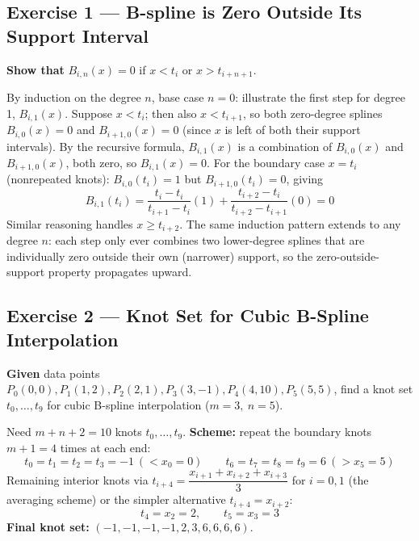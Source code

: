 \documentclass[12pt, a4paper]{article}
\newenvironment{solutionbox}{\begin{mdframed}[style=solutionframe]}{\end{mdframed}}
\newenvironment{answerbox}{\begin{mdframed}[style=answerframe]}{\end{mdframed}}
\begin{document}
\subsection*{Exercise 1 --- B-spline is Zero Outside Its Support Interval}
\begin{solutionbox}
\textbf{Show that} $B_{i,n}(x)=0$ if $x<t_i$ or $x>t_{i+n+1}$.
\end{solutionbox}
\begin{answerbox}
By induction on the degree $n$, base case $n=0$: illustrate the first step for degree 1, $B_{i,1}(x)$. Suppose $x<t_i$; then also $x<t_{i+1}$, so both zero-degree splines $B_{i,0}(x)=0$ and $B_{i+1,0}(x)=0$ (since $x$ is left of both their support intervals). By the recursive formula, $B_{i,1}(x)$ is a combination of $B_{i,0}(x)$ and $B_{i+1,0}(x)$, both zero, so $B_{i,1}(x)=0$.
For the boundary case $x=t_i$ (nonrepeated knots): $B_{i,0}(t_i)=1$ but $B_{i+1,0}(t_i)=0$, giving
$$B_{i,1}(t_i) = \frac{t_i-t_i}{t_{i+1}-t_i}(1) + \frac{t_{i+2}-t_i}{t_{i+2}-t_{i+1}}(0) = 0$$
Similar reasoning handles $x\ge t_{i+2}$. The same induction pattern extends to any degree $n$: each step only ever combines two lower-degree splines that are individually zero outside their own (narrower) support, so the zero-outside-support property propagates upward.
\end{answerbox}

\subsection*{Exercise 2 --- Knot Set for Cubic B-Spline Interpolation}
\begin{solutionbox}
\textbf{Given} data points $P_0(0,0),P_1(1,2),P_2(2,1),P_3(3,-1),P_4(4,10),P_5(5,5)$, find a knot set $t_0,\dots,t_9$ for cubic B-spline interpolation ($m=3,\ n=5$).
\end{solutionbox}
\begin{answerbox}
Need $m+n+2=10$ knots $t_0,\dots,t_9$. \textbf{Scheme:} repeat the boundary knots $m+1=4$ times at each end:
$$t_0=t_1=t_2=t_3=-1\ (<x_0=0) \qquad t_6=t_7=t_8=t_9=6\ (>x_5=5)$$
Remaining interior knots via $t_{i+4}=\dfrac{x_{i+1}+x_{i+2}+x_{i+3}}{3}$ for $i=0,1$ (the averaging scheme) or the simpler alternative $t_{i+4}=x_{i+2}$:
$$t_4 = x_2 = 2, \qquad t_5 = x_3 = 3$$
\textbf{Final knot set:} $(-1,-1,-1,-1,2,3,6,6,6,6)$.
\end{answerbox}
\end{document}
